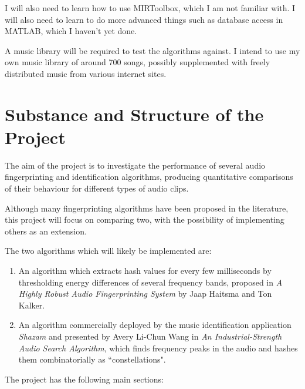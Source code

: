 \documentclass[12pt]{article}
\begin{document}
I will also need to learn how to use MIRToolbox, which I am not familiar with. I will also need to learn to do more advanced things such as database access in MATLAB, which I haven't yet done.

A music library will be required to test the algorithms against. I intend to use my own music library of around 700 songs, possibly supplemented with freely distributed music from various internet sites. 

\section*{Substance and Structure of the Project}

The aim of the project is to investigate the performance of several audio fingerprinting and identification algorithms, producing quantitative comparisons of their behaviour for different types of audio clips. 

Although many fingerprinting algorithms have been proposed in the literature, this project will focus on comparing two, with the possibility of implementing others as an extension. 

The two algorithms which will likely be implemented are:

\begin{enumerate}

\item An algorithm which extracts hash values for every few milliseconds by thresholding energy differences of several frequency bands, proposed in \emph{A Highly Robust Audio Fingerprinting System} by Jaap Haitsma and Ton Kalker.

\item An algorithm commercially deployed by the music identification application \emph{Shazam} and presented by Avery Li-Chun Wang in \emph{An Industrial-Strength Audio Search Algorithm}, which finds frequency peaks in the audio and hashes them combinatorially as ``constellations".

\end{enumerate}

The project has the following main sections:
\end{document}
